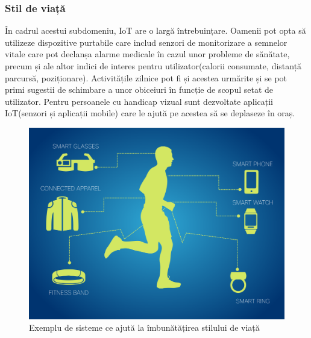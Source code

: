 \documentclass[12pt,a4paper]{report}
\begin{document}
\subsubsection{Stil de viață}
În cadrul acestui subdomeniu, IoT are o largă întrebuințare. Oamenii pot opta să utilizeze dispozitive purtabile care includ senzori de monitorizare a semnelor vitale care pot declanșa alarme medicale în cazul unor probleme de sănătate, precum și ale altor indici de interes pentru utilizator(calorii consumate, distanță parcursă, poziționare). Activitățile zilnice pot fi și acestea urmărite și se pot primi sugestii de schimbare a unor obiceiuri în funcție de scopul setat de utilizator. Pentru persoanele cu handicap vizual sunt dezvoltate aplicații IoT(senzori și aplicații mobile) care le ajută pe acestea să se deplaseze în oraș. 
\begin{figure}[th]
\centering
\includegraphics{pics/iot_health.png}
  \caption{Exemplu de sisteme ce ajută la îmbunătățirea stilului de viață}
  \label{fig:iot_health}
\end{figure}
\end{document}
